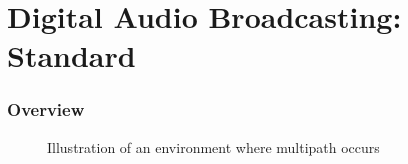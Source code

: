 \documentclass[class=beamer,11pt,crop=false]{standalone}
\begin{document}
 

\section{Digital Audio Broadcasting: Standard}

\begin{frame}
    \frametitle{Overview}
    
    \begin{figure}[htbp]
        \centering
        \captionsetup{type=figure}
        \def\svgwidth{0.8\linewidth}
        {\tiny
        }
        \caption{Illustration of an environment where multipath occurs}
        \label{fig:multipath-illustration}
    \end{figure}
    
\end{frame}
\end{document}
